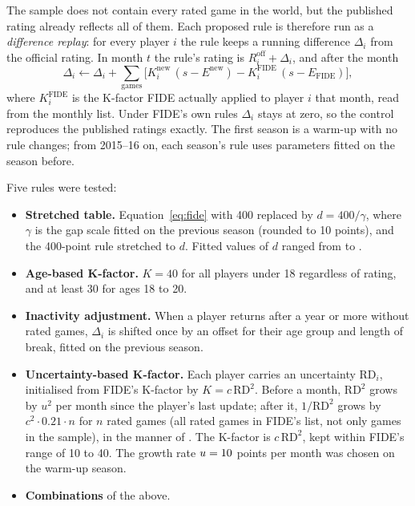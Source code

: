 \documentclass[11pt]{article}
\begin{document}
The sample does not contain every rated game in the world, but the published rating already reflects all of them. Each proposed rule is therefore run as a \emph{difference replay}: for every player $i$ the rule keeps a running difference $\Delta_i$ from the official rating. In month $t$ the rule's rating is $R_i^{\mathrm{off}} + \Delta_i$, and after the month
\begin{equation}
\Delta_i \leftarrow \Delta_i + \sum_{\text{games}} \Big[ K^{\mathrm{new}}_i\,(s - E^{\mathrm{new}}) - K^{\mathrm{FIDE}}_i\,(s - E_{\mathrm{FIDE}}) \Big],
\label{eq:replay}
\end{equation}
where $K^{\mathrm{FIDE}}_i$ is the K-factor FIDE actually applied to player $i$ that month, read from the monthly list. Under FIDE's own rules $\Delta_i$ stays at zero, so the control reproduces the published ratings exactly. The first season is a warm-up with no rule changes; from 2015--16 on, each season's rule uses parameters fitted on the season before.

Five rules were tested:
\begin{itemize}
  \item \textbf{Stretched table.} Equation~\eqref{eq:fide} with 400 replaced by $d = 400/\gamma$, where $\gamma$ is the gap scale fitted on the previous season (rounded to 10 points), and the 400-point rule stretched to $d$. Fitted values of $d$ ranged from \DivisorMin{} to \DivisorMax{}.
  \item \textbf{Age-based K-factor.} $K = 40$ for all players under 18 regardless of rating, and at least 30 for ages 18 to 20.
  \item \textbf{Inactivity adjustment.} When a player returns after a year or more without rated games, $\Delta_i$ is shifted once by an offset for their age group and length of break, fitted on the previous season.
  \item \textbf{Uncertainty-based K-factor.} Each player carries an uncertainty $\mathrm{RD}_i$, initialised from FIDE's K-factor by $K = c\,\mathrm{RD}^2$. Before a month, $\mathrm{RD}^2$ grows by $u^2$ per month since the player's last update; after it, $1/\mathrm{RD}^2$ grows by $c^2 \cdot 0.21 \cdot n$ for $n$ rated games (all rated games in FIDE's list, not only games in the sample), in the manner of \citet{glickman1999}. The K-factor is $c\,\mathrm{RD}^2$, kept within FIDE's range of 10 to 40. The growth rate $u = 10{}$ points per month was chosen on the warm-up season.
  \item \textbf{Combinations} of the above.
\end{itemize}
\end{document}

